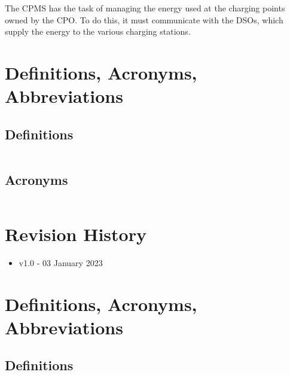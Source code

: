 The CPMS has the task of managing the energy used at the charging points owned by the CPO. To do this, it must communicate with the DSOs, which supply the energy to the various charging stations.



\section{Definitions, Acronyms, Abbreviations}

\subsection{Definitions}

\begin{tabular}{|p{5cm}|p{10cm}|}
	\hline
	\hline
\end{tabular}

\subsection{Acronyms}
\begin{tabular}{|l|l|}
	\hline
	\hline
\end{tabular}

\section{Revision History}
\begin{itemize}
	\item v1.0 - 03 January 2023
\end{itemize}

\section{Definitions, Acronyms, Abbreviations}

\subsection{Definitions}

